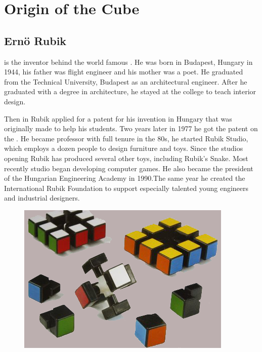\chapter{Origin of the Cube}

\section{Ern\"{o} Rubik}
\erno{} is the inventor behind the world famous \rubik{}. He was born in Budapest, Hungary in 1944, his father was flight engineer and his mother was a poet. He graduated from the Technical University, Budapest as an architectural engineer. After he graduated with a degree in architecture, he stayed at the college to teach interior design.

Then in  Rubik applied for a patent for his invention in Hungary that was originally made to help his students. Two years later in 1977 he got the patent on the \mcube{}.
He became professor with full tenure in the 80s, he started Rubik Studio, which employs a dozen people to design furniture and toys. 
Since the studios opening Rubik has produced several other toys, including Rubik's Snake. Most recently studio began developing computer games. He also became the president of the Hungarian Engineering Academy in 1990.The same year he created the International Rubik Foundation to support especially talented young engineers and industrial designers.

\begin{figure}
	\centering
		\includegraphics[scale=0.8]{input/pics/rubiks-cube.png}
	\caption{}
	\label{fig:rubiks-cube}
\end{figure}
 

